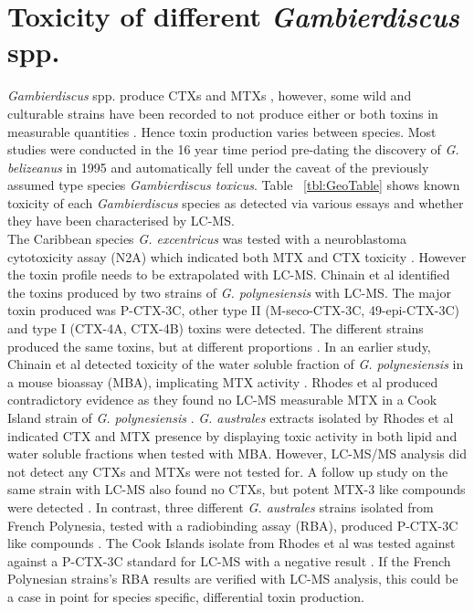 \documentclass[12pt]{article}
\begin{document}
\section{Toxicity of different \emph{Gambierdiscus} spp.}
\emph{Gambierdiscus} spp. produce CTXs and MTXs \cite{murata1990structures,holmes1991strain,satake1993structure,holmes1994purification,satake1996isolation}, however, some wild and culturable strains have been recorded to not produce either or both toxins in measurable quantities \cite{gillespie1985significance,holmes1990toxicity}. Hence toxin production varies between species. Most studies were conducted in the 16 year time period pre-dating the discovery of \emph{G. belizeanus} in 1995 \cite{faust1995observation} and automatically fell under the caveat of the previously assumed type species \emph{Gambierdiscus toxicus}. Table ~\ref{tbl:GeoTable} shows known toxicity of each \emph{Gambierdiscus} species as detected via various essays and whether they have been characterised by LC-MS. \\
The Caribbean species \emph{G. excentricus} was tested with a neuroblastoma cytotoxicity assay (N2A) which indicated both MTX and CTX toxicity \cite{fraga2011gambierdiscus}. However the toxin profile needs to be extrapolated with LC-MS.
Chinain et al identified the toxins produced by two strains of \emph{G. polynesiensis} with LC-MS. The major toxin produced was P-CTX-3C, other type II (M-seco-CTX-3C, 49-epi-CTX-3C) and type I (CTX-4A, CTX-4B) toxins were detected. The different strains produced the same toxins, but at different proportions \cite{chinain2010growth}. In an earlier study, Chinain et al detected toxicity of the water soluble fraction of \emph{G. polynesiensis} in a mouse bioassay (MBA), implicating MTX activity \cite{chinain1999morphology}. Rhodes et al produced contradictory evidence as they found no LC-MS measurable MTX in a Cook Island strain of \emph{G. polynesiensis} \cite{rhodes2014production}.
\emph{G. australes} extracts isolated by Rhodes et al indicated CTX and MTX presence by displaying toxic activity in both lipid and water soluble fractions when tested with MBA. However, LC-MS/MS analysis did not detect any CTXs and MTXs were not tested for. A follow up study on the same strain with LC-MS also found no CTXs, but potent MTX-3 like compounds were detected \cite{rhodes2014production,rhodes2010toxic}. In contrast, three different \emph{G. australes} strains isolated from French Polynesia, tested with a radiobinding assay (RBA), produced P-CTX-3C like compounds \cite{chinain2010growth}. The Cook Islands isolate from Rhodes et al was tested against against a P-CTX-3C standard for LC-MS with a negative result \cite{rhodes2014production}. If the French Polynesian strains's RBA results are verified with LC-MS analysis, this could be a case in point for species specific, differential toxin production. \\
\end{document}
